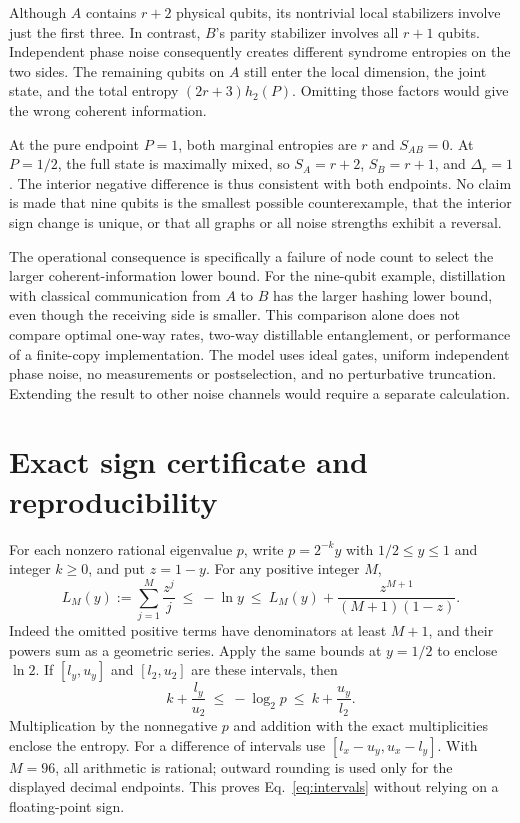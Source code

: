 \documentclass[11pt,a4paper]{article}
\begin{document}
Although $A$ contains $r+2$ physical qubits, its nontrivial local stabilizers
involve just the first three. In contrast, $B$'s parity stabilizer involves
all $r+1$ qubits. Independent phase noise consequently creates different
syndrome entropies on the two sides. The remaining qubits on $A$ still enter
the local dimension, the joint state, and the total entropy
$(2r+3)h_2(P)$. Omitting those factors would give the wrong coherent information.

At the pure endpoint $P=1$, both marginal entropies are $r$ and $S_{AB}=0$.
At $P=1/2$, the full state is maximally mixed, so $S_A=r+2$, $S_B=r+1$,
and $\Delta_r=1$. The interior negative difference is thus consistent with
both endpoints. No claim is made that nine qubits is the smallest possible
counterexample, that the interior sign change is unique, or that all graphs
or all noise strengths exhibit a reversal.

The operational consequence is specifically a failure of node count to select
the larger coherent-information lower bound. For the nine-qubit example,
distillation with classical communication from $A$ to $B$ has the larger
hashing lower bound, even though the receiving side is smaller. This comparison
alone does not compare optimal one-way rates, two-way distillable entanglement,
or performance of a finite-copy implementation. The model uses ideal gates,
uniform independent phase noise, no measurements or postselection, and no
perturbative truncation. Extending the result to other noise channels would
require a separate calculation.

\appendix
\section{Exact sign certificate and reproducibility}\label{app:certificate}

For each nonzero rational eigenvalue $p$, write $p=2^{-k}y$ with
$1/2\leq y\leq1$ and integer $k\geq0$, and put $z=1-y$. For any positive
integer $M$,
\begin{equation}
 L_M(y):=\sum_{j=1}^M\frac{z^j}{j}
 \ \leq\ -\ln y\ \leq\
 L_M(y)+\frac{z^{M+1}}{(M+1)(1-z)}.
 \label{eq:mercator}
\end{equation}
Indeed the omitted positive terms have denominators at least $M+1$, and
their powers sum as a geometric series. Apply the same bounds at $y=1/2$
to enclose $\ln2$. If $[l_y,u_y]$ and $[l_2,u_2]$ are these intervals, then
\begin{equation}
 k+\frac{l_y}{u_2}\ \leq\ -\log_2p\ \leq\
 k+\frac{u_y}{l_2}.
 \label{eq:surprisal}
\end{equation}
Multiplication by the nonnegative $p$ and addition with the exact
multiplicities enclose the entropy. For a difference of intervals use
$[l_x-u_y,u_x-l_y]$. With $M=96$, all arithmetic is rational;
outward rounding is used only for the displayed decimal endpoints.
This proves Eq.~\eqref{eq:intervals} without relying on a floating-point sign.
\end{document}
